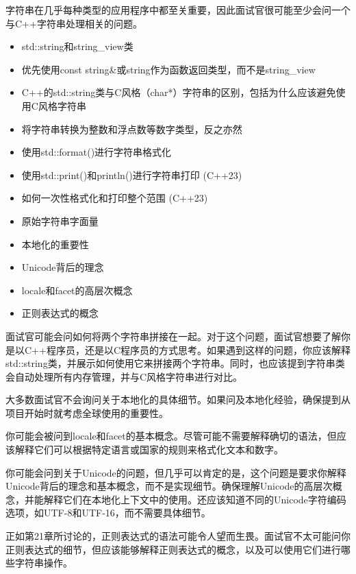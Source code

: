 

字符串在几乎每种类型的应用程序中都至关重要，因此面试官很可能至少会问一个与C++字符串处理相关的问题。


\begin{itemize}
\item
std::string和string\_view类

\item
优先使用const string\&或string作为函数返回类型，而不是string\_view

\item
C++的std::string类与C风格（char*）字符串的区别，包括为什么应该避免使用C风格字符串

\item
将字符串转换为整数和浮点数等数字类型，反之亦然

\item
使用std::format()进行字符串格式化

\item
使用std::print()和println()进行字符串打印 (C++23)

\item
如何一次性格式化和打印整个范围 (C++23)

\item
原始字符串字面量

\item
本地化的重要性

\item
Unicode背后的理念

\item
locale和facet的高层次概念

\item
正则表达式的概念
\end{itemize}


面试官可能会问如何将两个字符串拼接在一起。对于这个问题，面试官想要了解你是以C++程序员，还是以C程序员的方式思考。如果遇到这样的问题，你应该解释std::string类，并展示如何使用它来拼接两个字符串。同时，也应该提到字符串类会自动处理所有内存管理，并与C风格字符串进行对比。

大多数面试官不会询问关于本地化的具体细节。如果问及本地化经验，确保提到从项目开始时就考虑全球使用的重要性。

你可能会被问到locale和facet的基本概念。尽管可能不需要解释确切的语法，但应该解释它们可以根据特定语言或国家的规则来格式化文本和数字。

你可能会问到关于Unicode的问题，但几乎可以肯定的是，这个问题是要求你解释Unicode背后的理念和基本概念，而不是实现细节。确保理解Unicode的高层次概念，并能解释它们在本地化上下文中的使用。还应该知道不同的Unicode字符编码选项，如UTF-8和UTF-16，而不需要具体细节。

正如第21章所讨论的，正则表达式的语法可能令人望而生畏。面试官不太可能问你正则表达式的细节，但应该能够解释正则表达式的概念，以及可以使用它们进行哪些字符串操作。





